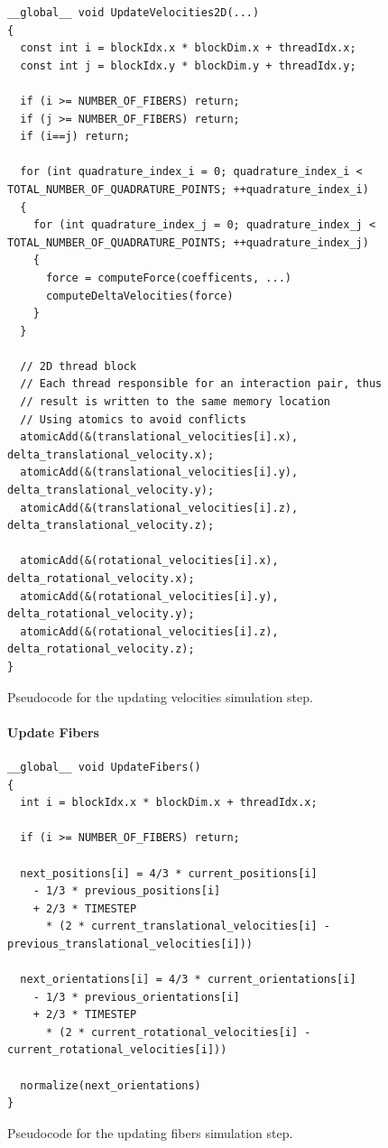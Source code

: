 \documentclass[a4paper,11pt]{kth-mag}
\begin{document}
\begin{listing}
  \centering
  \begin{verbatim}
__global__ void UpdateVelocities2D(...)
{
  const int i = blockIdx.x * blockDim.x + threadIdx.x;
  const int j = blockIdx.y * blockDim.y + threadIdx.y;

  if (i >= NUMBER_OF_FIBERS) return;
  if (j >= NUMBER_OF_FIBERS) return;
  if (i==j) return;

  for (int quadrature_index_i = 0; quadrature_index_i < TOTAL_NUMBER_OF_QUADRATURE_POINTS; ++quadrature_index_i)
  {
    for (int quadrature_index_j = 0; quadrature_index_j < TOTAL_NUMBER_OF_QUADRATURE_POINTS; ++quadrature_index_j)
    {
      force = computeForce(coefficents, ...)
      computeDeltaVelocities(force)
    }
  }

  // 2D thread block
  // Each thread responsible for an interaction pair, thus
  // result is written to the same memory location
  // Using atomics to avoid conflicts
  atomicAdd(&(translational_velocities[i].x), delta_translational_velocity.x);
  atomicAdd(&(translational_velocities[i].y), delta_translational_velocity.y);
  atomicAdd(&(translational_velocities[i].z), delta_translational_velocity.z);

  atomicAdd(&(rotational_velocities[i].x), delta_rotational_velocity.x);
  atomicAdd(&(rotational_velocities[i].y), delta_rotational_velocity.y);
  atomicAdd(&(rotational_velocities[i].z), delta_rotational_velocity.z);
}
  \end{verbatim}
  \caption{Pseudocode for the updating velocities simulation step.}
  \label{lst:pseudo_update_velocities}
\end{listing}

\paragraph{Update Fibers}

\begin{listing}
  \centering
  \begin{verbatim}
__global__ void UpdateFibers()
{
  int i = blockIdx.x * blockDim.x + threadIdx.x;

  if (i >= NUMBER_OF_FIBERS) return;

  next_positions[i] = 4/3 * current_positions[i]
    - 1/3 * previous_positions[i]
    + 2/3 * TIMESTEP
      * (2 * current_translational_velocities[i] - previous_translational_velocities[i]))

  next_orientations[i] = 4/3 * current_orientations[i]
    - 1/3 * previous_orientations[i]
    + 2/3 * TIMESTEP
      * (2 * current_rotational_velocities[i] - current_rotational_velocities[i]))

  normalize(next_orientations)
}
  \end{verbatim}
  \caption{Pseudocode for the updating fibers simulation step.}
  \label{lst:pseudo_update_fibers}
\end{listing}
\end{document}
